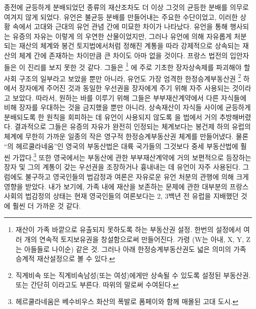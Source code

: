 종전에 균등하게 분배되었던 종류의 재산조차도
더 이상 그것의 균등한 분배를 의무로 여겨지 않게 되었다.
유언은 불균등 분배를 만들어내는 주요한 수단이었고,
이러한 상황 속에서
고대와 근대의 유언 관념 간에 미묘한 차이가 나타났다.
유언을 통해 행사되는 유증의 자유는 이렇게 의 우연한 산물이었지만,
그러나
유언에 의해 자유롭게 처분되는 재산의 체계와
봉건 토지법에서처럼
정해진 계통을 따라 강제적으로 상속되는 재산의 체계
간에 존재하는 차이만큼 큰 차이도 아마 없을 것이다.
프랑스 법전의 입안자들은 이 진리를 보지 못한 것 같다.
그들은
%
\footnote{재산이 가족 바깥으로 유출되지 못하도록 하는 부동산권 설정.
  한번의 설정에서 여러 개의 연속적 토지보유권을 창설함으로써 만들어진다.
  가령  (W는 아내, X, Y, Z는 아들들로 나이순) 같은 것.
  그러나 아래 한정승계부동산권도 넓은 의미의 가족승계적 재산설정으로 볼 수 있다.
}%
에 주로 기초한
장자상속제를
파괴해야 할 사회 구조의 일부라고
보았을 뿐만 아니라,
유언도
가장 엄격한 한정승계부동산권%
\footnote{직계비속 또는 직계비속남성(또는 여성)에게만 상속될 수 있도록
  설정된 부동산권.
   또는 간단히 이라고도 부른다.
   따위의 말로써 수여된다.
  }
하에서 장자에게 주어진 것과
동일한 우선권을
장자에게
주기 위해 자주 사용되는 것이라고 보았다.
따라서,
원하는 바를 이루기 위해 그들은
부부재산계약에서 다른 자식들에 비해 장자를 우대하는 것을 금지했을 뿐만 아니라,
상속재산이 자식들 사이에 균등하게 분배되도록 한 원칙을 회피하는 데
유언이
사용되지 않도록
을 법에서 거의 추방해버렸다.
결과적으로 그들은
유증의 자유가 완전히 인정되는 체계보다는
봉건제 하의 유럽의 체계에 무한히 가까운
일종의 작은 영구적 한정승계부동산권 체계를 만들어냈다.
물론
``의 헤르쿨라네움''인 영국의 부동산법은
대륙 국가들의 그것보다 중세 부동산법에 훨씬 가깝다.\footnote{%
  헤르쿨라네움은 베수비우스 화산의 폭발로 폼페이와 함께 매몰된 고대 도시.}
또한 영국에서는
부동산에 관한 부부재산계약에 거의 보편적으로 등장하는
장자 및 그의 계통이 갖는 우선권을 조장하거나 흉내내는 데
유언이
자주 사용된다.
그럼에도 불구하고 영국인들의 법감정과 여론은
자유로운 유언 처분의 관행에 의해 크게 영향을 받았다.
내가 보기에,
가족 내에 재산을 보존하는 문제에 관한
대부분의 프랑스 사회의 법감정의 상태는
현재 영국인들의 여론보다는 2, 3백년 전 유럽을 지배했던 것에
훨씬 더 가까운 것 같다.

